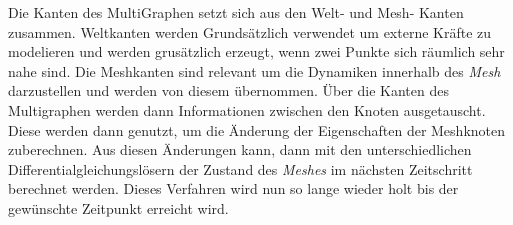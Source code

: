 Die Kanten des MultiGraphen setzt sich aus den Welt- und Mesh- Kanten zusammen.
Weltkanten werden Grundsätzlich verwendet um externe Kräfte zu modelieren und werden grusätzlich erzeugt, wenn zwei 
Punkte sich räumlich sehr nahe sind.
Die Meshkanten sind relevant um die Dynamiken innerhalb des \textit{Mesh} darzustellen und werden von diesem übernommen.
Über die Kanten des Multigraphen werden dann Informationen zwischen den Knoten ausgetauscht.
Diese werden dann genutzt, um die Änderung der Eigenschaften der Meshknoten zuberechnen.
Aus diesen Änderungen kann, 
dann mit den unterschiedlichen Differentialgleichungslösern der Zustand des \textit{Meshes} im nächsten Zeitschritt berechnet werden. 
Dieses Verfahren wird nun so lange wieder holt bis der gewünschte Zeitpunkt erreicht wird.










